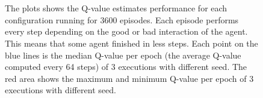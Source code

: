 \begin{figure}[t]
	\centering
	 \quad
	 \\
	 \quad
	 \\
	
	\caption{The plots shows the Q-value estimates performance for each configuration running for 3600 episodes. Each episode performs every step depending on the good or bad interaction of the agent. This means that some agent finished in less steps. Each point on the blue lines is the median Q-value per epoch (the average Q-value computed every 64 steps) of 3 executions with different seed. The red area shows the maximum and minimum Q-value per epoch of 3 executions with different seed.}
	\label{fig:q-values}
\end{figure}


